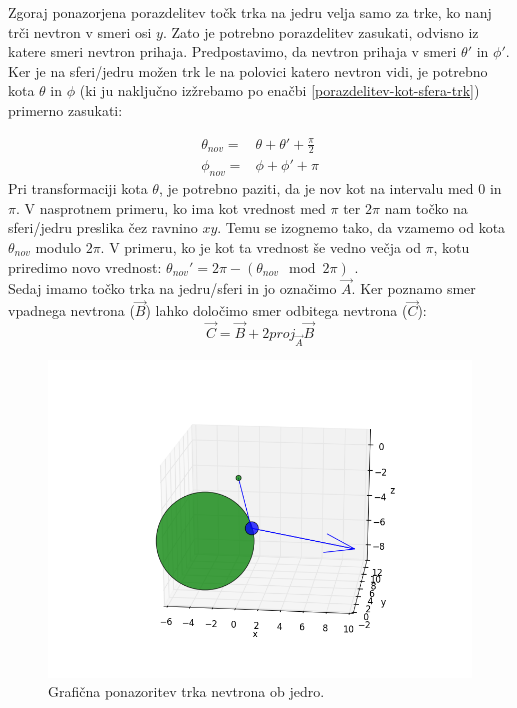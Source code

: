 \documentclass[slovene,11pt,a4paper]{article}
\numberwithin{equation}{section} %
\numberwithin{figure}{section} %
\numberwithin{table}{section} %
\begin{document}
\FloatBarrier

Zgoraj ponazorjena porazdelitev točk trka na jedru velja samo za trke, ko nanj trči nevtron v smeri osi $y$. Zato je potrebno porazdelitev zasukati, odvisno iz katere smeri nevtron prihaja. Predpostavimo, da nevtron prihaja v smeri $\theta'$ in $\phi'$. Ker je na sferi/jedru možen trk le na polovici katero nevtron vidi, je potrebno kota $\theta$ in $\phi$ (ki ju naključno izžrebamo po enačbi \ref{porazdelitev-kot-sfera-trk}) primerno zasukati:

\begin{equation}
\begin{aligned}
\theta_{nov}=& \theta + \theta' + \frac{\pi}{2} \\
\phi_{nov} = & \phi + \phi' + \pi
\end{aligned}
\end{equation}
Pri transformaciji kota $\theta$, je potrebno paziti, da je nov kot na intervalu med $0$ in $\pi$. V nasprotnem primeru, ko ima kot vrednost med $\pi$ ter $ 2 \pi$ nam točko na sferi/jedru preslika čez ravnino $xy$.  Temu se izognemo tako, da vzamemo od kota $\theta_{nov}$ modulo $2 \pi$. V primeru, ko je kot ta vrednost še vedno večja od $\pi$, kotu priredimo novo vrednost: $\theta_{nov}' = 2 \pi - (\theta_{nov}\mod 2 \pi ) $ .\\
Sedaj imamo točko trka na jedru/sferi in jo označimo $\vec{A}$. Ker poznamo  smer vpadnega nevtrona ($\vec{B}$) lahko določimo smer odbitega nevtrona ($\vec{C}$):
\begin{equation}
\vec{C}=\vec{B}+2 proj_{\vec{A}}\vec{B}
\end{equation}


\begin{figure}[!htb]
\centering
\includegraphics[scale=0.4]{slike/trk_na_jedru.png}
\caption{Grafična ponazoritev trka nevtrona ob jedro.}
\end{figure}
\end{document}
